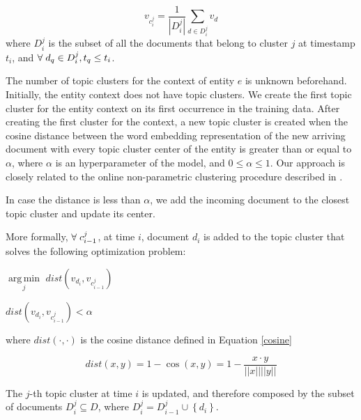 \documentclass{article}
\DeclareMathOperator*{\argmin}{arg\,min}
\begin{document}
\begin{equation}
\label{nonparamclust}
v_{c^j_i} = \frac{1}{|D^j_i|} \sum_{d \in D^j_i}{v_d}
\end{equation}
where $D^j_i$ is the subset of all the documents that belong to cluster $j$ at timestamp $t_i$, and $\forall\hspace{1mm}d_q \in D^j_i, t_q \leq t_i$.

The number of topic clusters for the context of entity $e$ is unknown beforehand. Initially, the entity context does not have topic clusters. We create the first topic cluster for the entity context on its first occurrence in the training data. After creating the first cluster for the context, a new topic cluster is created when the cosine distance between the word embedding representation of the new arriving document with every topic cluster center of the entity is greater than or equal to $\alpha$, where $\alpha$ is an hyperparameter of the model, and $0 \leq \alpha \leq 1$. Our approach is closely related to the online non-parametric clustering procedure described in \citet{Arvind14}.

In case the distance is less than $\alpha$, we add the incoming document to the closest topic cluster and update its center. 

More formally, $\forall\hspace{1mm}c^j_{i-1}$, at time $i$, document $d_i$ is added to the topic cluster that solves the following optimization problem:\\

\centerline{$\underset{j}{\argmin}$\;\; $dist(v_{d_i}, v_{c^j_{i-1}})$} 
\medskip
\centerline{ $dist(v_{d_i}, v_{c^j_{i-1}}) < \alpha$}

where $dist(\cdot,\cdot)$ is the cosine distance defined in Equation \ref{cosine}

\begin{equation}
\label{cosine}
dist(x,y) = 1 - \cos(x,y) = 1 - \frac{x \cdot y}{||x||||y||}
\end{equation}

The $j$-th topic cluster at time $i$ is updated, and therefore composed by the subset of documents $D^j_i \subseteq D$, where $D^j_i = D^j_{i-1} \cup \left\{ {d_i}\right\}$.
\end{document}
